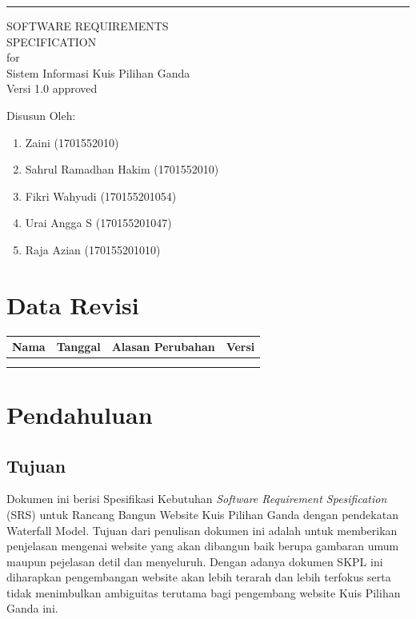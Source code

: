 \documentclass{scrreprt}
\date{}
\def\myversion{1.0 }
\begin{document}
\begin{flushright}
    \rule{16cm}{5pt}\vskip1cm
    \begin{bfseries}
        \Huge{SOFTWARE REQUIREMENTS\\ SPECIFICATION}\\
        \vspace{1.9cm}
        for\\
        \vspace{1.9cm}
        Sistem Informasi Kuis Pilihan Ganda\\
        \vspace{1.9cm}
        \LARGE{Versi \myversion approved}\\
        
    \end{bfseries}
\end{flushright}
\newpage
Disusun Oleh:
\begin{enumerate}
	\item Zaini (1701552010)
	\item Sahrul Ramadhan Hakim (1701552010)
	\item Fikri Wahyudi (170155201054)
	\item Urai Angga S (170155201047)
	\item Raja Azian (170155201010)
\end{enumerate}


\tableofcontents


\chapter*{Data Revisi}

\begin{center}
    \begin{tabular}{|c|c|c|c|}
        \hline
	    Nama & Tanggal & Alasan Perubahan & Versi\\
        \hline
	     &  &  & \\
        \hline
	     &  &  & \\
        \hline
    \end{tabular}
\end{center}

\chapter{Pendahuluan}

\section{Tujuan}
Dokumen ini berisi Spesifikasi Kebutuhan \emph{Software Requirement Spesification} (SRS) untuk Rancang Bangun Website Kuis Pilihan Ganda dengan pendekatan Waterfall Model. Tujuan dari penulisan dokumen ini adalah untuk memberikan penjelasan mengenai website yang akan dibangun baik berupa gambaran umum maupun pejelasan detil dan menyeluruh.
Dengan adanya dokumen SKPL ini diharapkan pengembangan website akan lebih terarah dan lebih terfokus serta tidak menimbulkan ambiguitas terutama bagi pengembang website Kuis Pilihan Ganda ini.
\end{document}
